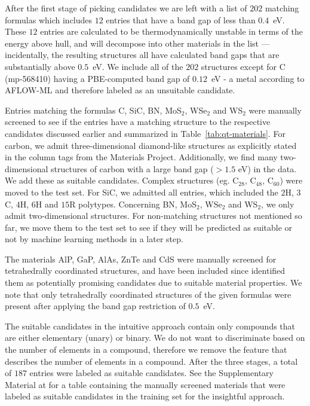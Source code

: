 \documentclass[superscriptaddress,unsortedaddress,
 amsmath,amssymb,
 aps,
]{revtex4-2}
\begin{document}
After the first stage of picking candidates we are left with a list of $202$ matching formulas which includes $12$ entries that have a band gap of less than $0.4$~eV. These $12$ entries are calculated to be thermodynamically unstable in terms of the energy above hull, and will decompose into other materials in the list --- incidentally, the resulting structures all have calculated band gaps that are substantially above $0.5$~eV. We include all of the $202$ structures except for C (mp-568410) having a PBE-computed band gap of $0.12$~eV - a metal according to AFLOW-ML and therefore labeled as an unsuitable candidate. 
 
Entries matching the formulas C, SiC, BN, MoS$_2$, WSe$_2$ and WS$_2$ were manually screened to see if the entries have a matching structure to the respective candidates discussed earlier and summarized in Table~\ref{tab:qt-materials}. 
For carbon, we admit three-dimensional diamond-like structures as explicitly stated in the column tags from the Materials Project. Additionally, we find many two-dimensional structures of carbon with a large band gap ($>1.5$ eV) in the data. We add these as suitable candidates. Complex structures (eg. C$_{28}$, C$_{48}$, C$_{60}$) were moved to the test set. For SiC, we admitted all entries, which included the $2$H, $3$C, $4$H, $6$H and $15$R polytypes. Concerning BN, MoS$_2$, WSe$_2$ and  WS$_2$, we only admit two-dimensional structures. For non-matching structures not mentioned so far, we move them to the test set to see if they will be predicted as suitable or not by machine learning methods  in a later step.

The materials AlP, GaP, AlAs, ZnTe and CdS were manually screened for tetrahedrally coordinated structures, and have been included since \citeauthor{Weber2010} \cite{Weber2010}  identified them as potentially promising candidates due to suitable material properties. 
We note that only tetrahedrally coordinated structures of the given formulas were present after applying the band gap restriction of $0.5$~eV.

The suitable candidates in the intuitive approach contain only compounds that are either elementary (unary) or binary. We do not want to discriminate based on the number of elements in a compound, therefore we remove the feature that describes the number of elements in a compound. After the three stages, a total of $187$ entries were labeled as suitable candidates.
See the Supplementary Material at \cite{supplementary} for a table containing the manually screened materials that were labeled as suitable candidates in the training set for the insightful approach. 
\end{document}
